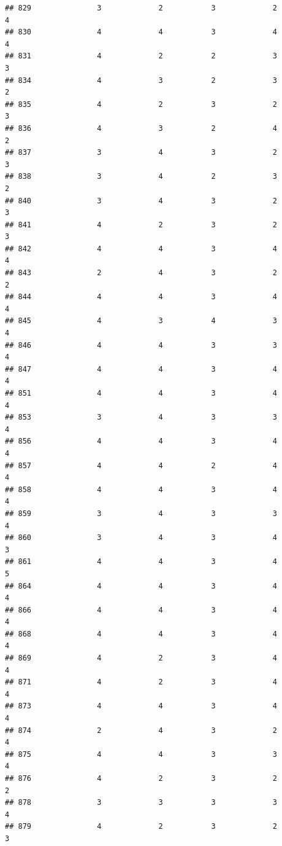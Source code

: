 \documentclass[
]{article}
\begin{document}
\begin{verbatim}
## 829               3             2           3             2            4
## 830               4             4           3             4            4
## 831               4             2           2             3            3
## 834               4             3           2             3            2
## 835               4             2           3             2            3
## 836               4             3           2             4            2
## 837               3             4           3             2            3
## 838               3             4           2             3            2
## 840               3             4           3             2            3
## 841               4             2           3             2            3
## 842               4             4           3             4            4
## 843               2             4           3             2            2
## 844               4             4           3             4            4
## 845               4             3           4             3            4
## 846               4             4           3             3            4
## 847               4             4           3             4            4
## 851               4             4           3             4            4
## 853               3             4           3             3            4
## 856               4             4           3             4            4
## 857               4             4           2             4            4
## 858               4             4           3             4            4
## 859               3             4           3             3            4
## 860               3             4           3             4            3
## 861               4             4           3             4            5
## 864               4             4           3             4            4
## 866               4             4           3             4            4
## 868               4             4           3             4            4
## 869               4             2           3             4            4
## 871               4             2           3             4            4
## 873               4             4           3             4            4
## 874               2             4           3             2            4
## 875               4             4           3             3            4
## 876               4             2           3             2            2
## 878               3             3           3             3            4
## 879               4             2           3             2            3

\end{verbatim}
\end{document}
